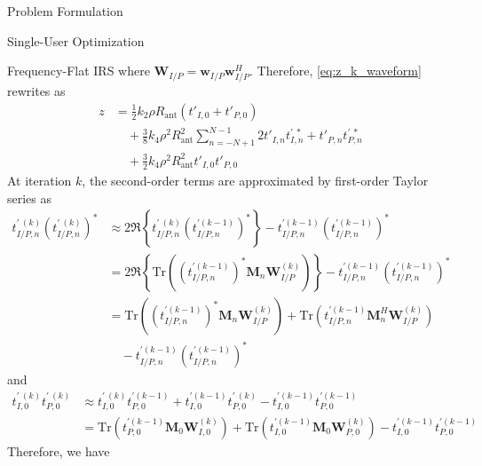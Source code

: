 \documentclass{IEEEtran}
\begin{document}
\begin{section}{Problem Formulation}
\begin{subsection}{Single-User Optimization}
\begin{subsubsection}{Frequency-Flat IRS}
			where $\boldsymbol{W}_{I/P}=\boldsymbol{w}_{I/P}\boldsymbol{w}_{I/P}^H$. Therefore, \ref{eq:z_k_waveform} rewrites as
			\begin{equation}\label{eq:z_k_waveform_t}
				\begin{split}
					z
					&=\frac{1}{2}{k_2}{\rho}{R_{\text{ant}}}(t'_{I,0}+t'_{P,0})\\
					&\quad+\frac{3}{8}{k_4}{\rho^2}{R_{\text{ant}}^2}\sum_{n=-N+1}^{N-1}{2t'_{I,n}t_{I,n}^{\prime \ *}+t'_{P,n}t_{P,n}^{\prime \ *}}\\
					&\quad+\frac{3}{2}{k_4}{\rho^2}{R_{\text{ant}}^2}t'_{I,0}t'_{P,0}
				\end{split}
			\end{equation}
			At iteration $k$, the second-order terms are approximated by first-order Taylor series as
			\begin{equation}
				\begin{split}
					t_{I/P,n}^{\prime \ (k)} (t_{I/P,n}^{\prime \ (k)})^*
					& \approx 2 \Re\left\{t_{I/P,n}^{\prime \ (k)} (t_{I/P,n}^{\prime (k-1)})^*\right\} - t_{I/P,n}^{\prime (k-1)} (t_{I/P,n}^{\prime (k-1)})^* \\
					& = 2 \Re \left\{\mathrm{Tr}((t_{I/P,n}^{\prime (k-1)})^*\boldsymbol{M}_{n}\boldsymbol{W}_{I/P}^{(k)})\right\} - t_{I/P,n}^{\prime (k-1)} (t_{I/P,n}^{\prime (k-1)})^*\\
					& = \mathrm{Tr}\left((t_{I/P,n}^{\prime (k-1)})^*\boldsymbol{M}_{n}\boldsymbol{W}_{I/P}^{(k)}\right) + \mathrm{Tr}(t_{I/P,n}^{\prime (k-1)}\boldsymbol{M}_{n}^H\boldsymbol{W}_{I/P}^{(k)})\\
					& \quad- t_{I/P,n}^{\prime (k-1)} (t_{I/P,n}^{\prime (k-1)})^*
				\end{split}
			\end{equation}
			and
			\begin{equation}
				\begin{split}
					t_{I,0}^{\prime \ (k)} t_{P,0}^{\prime \ (k)}
					& \approx t_{I,0}^{\prime \ (k)} t_{P,0}^{\prime (k-1)} + t_{I,0}^{\prime (k-1)} t_{P,0}^{\prime \ (k)} - t_{I,0}^{\prime (k-1)} t_{P,0}^{\prime (k-1)}\\
					& = \mathrm{Tr}\left(t_{P,0}^{\prime (k-1)}\boldsymbol{M}_{0}\boldsymbol{W}_{I,0}^{(k)}\right) + \mathrm{Tr}(t_{I,0}^{\prime (k-1)}\boldsymbol{M}_{0}\boldsymbol{W}_{P,0}^{(k)}) - t_{I,0}^{\prime (k-1)} t_{P,0}^{\prime (k-1)}
				\end{split}
			\end{equation}
			Therefore, we have
			\begin{equation}\label{eq:z_waveform_approx}

\end{equation}
\end{subsubsection}
\end{subsection}
\end{section}
\end{document}
